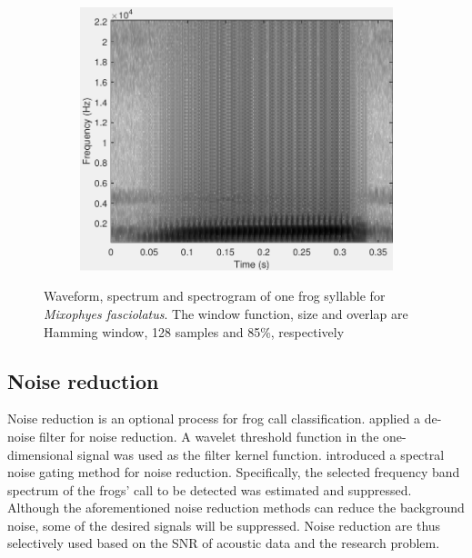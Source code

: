 \begin{figure}[htb!]
\begin{subfigure}[b]{0.32\textwidth}
           \includegraphics[width=1\textwidth,height=0.75\textwidth]{image/LR/spectrogram.pdf}
    \end{subfigure}%
\caption[Waveform, spectrum and spectrogram of one frog syllable]{Waveform, spectrum and spectrogram of one frog syllable for \textit{Mixophyes fasciolatus}. The window function, size and overlap are Hamming window, 128 samples and 85\%, respectively}
\label{fig:spectrogram}       %
\end{figure}





\subsection{Noise reduction}
Noise reduction is an optional process for frog call classification. 
\cite{Huang20141} applied a de-noise filter for noise reduction. A wavelet threshold function in the one-dimensional signal was used as the filter kernel function. \cite{bedoya2014automatic} introduced a spectral noise gating method for noise reduction. Specifically, the selected frequency band spectrum of the frogs' call to be detected was estimated and suppressed. Although the aforementioned noise reduction methods can reduce the background noise, some of the desired signals will be suppressed. Noise reduction are thus selectively used based on the SNR of acoustic data and the research problem.




